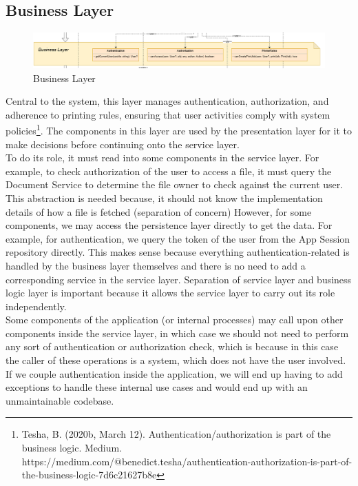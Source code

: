 \subsection{Business Layer}

\begin{figure}[H]
  \includegraphics[max width=0.9\linewidth]{chapters/6. architecture-design/Layered Architecture/2. Business Layer.png}
  \caption{Business Layer}%
\end{figure}

Central to the system, this layer manages authentication, authorization, and adherence to printing rules, ensuring that user activities comply with system policies\footnote{Tesha, B. (2020b, March 12). Authentication/authorization is part of the business logic. Medium. https://medium.com/@benedict.tesha/authentication-authorization-is-part-of-the-business-logic-7d6c21627b8e}. The components in this layer are used by the presentation layer for it to make decisions before continuing onto the service layer.\\

To do its role, it must read into some components in the service layer. For example, to check authorization of the user to access a file, it must query the Document Service to determine the file owner to check against the current user. This abstraction is needed because, it should not know the implementation details of how a file is fetched (separation of concern) However, for some components, we may access the persistence layer directly to get the data. For example, for authentication, we query the token of the user from the App Session repository directly. This makes sense because everything authentication-related is handled by the business layer themselves and there is no need to add a corresponding service in the service layer. Separation of service layer and business logic layer is important because it allows the service layer to carry out its role independently. \\

Some components of the application (or internal processes) may call upon other components inside the service layer, in which case we should not need to perform any sort of authentication or authorization check, which is because in this case the caller of these operations is a system, which does not have the user involved. If we couple authentication inside the application, we will end up having to add exceptions to handle these internal use cases and would end up with an unmaintainable codebase. \\

